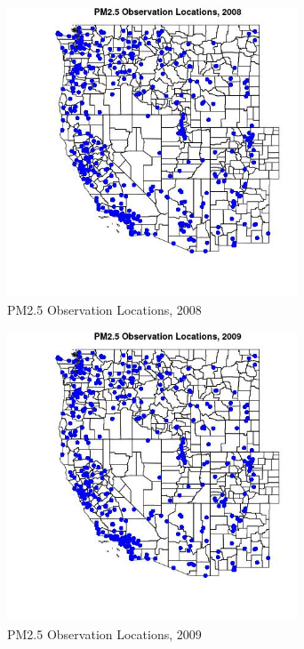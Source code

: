 \begin{figure} 
\centering  
\includegraphics[width=0.77\textwidth]{Code_Outputs/Report_PM25_Step4_part_e_de_duplicated_aves_prioritize_24hr_obs_ML_input_PlotLoc2008.jpg} 
\caption{\label{fig:Report_PM25_Step4_part_e_de_duplicated_aves_prioritize_24hr_obs_ML_inputPlotLoc2008}PM2.5 Observation Locations, 2008} 
\end{figure} 
 

\begin{figure} 
\centering  
\includegraphics[width=0.77\textwidth]{Code_Outputs/Report_PM25_Step4_part_e_de_duplicated_aves_prioritize_24hr_obs_ML_input_PlotLoc2009.jpg} 
\caption{\label{fig:Report_PM25_Step4_part_e_de_duplicated_aves_prioritize_24hr_obs_ML_inputPlotLoc2009}PM2.5 Observation Locations, 2009} 
\end{figure} 
 

